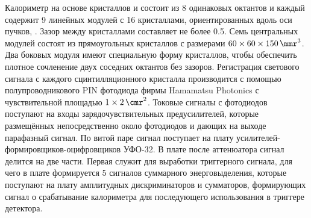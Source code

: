 Калориметр на основе кристаллов  и  состоит из 8 одинаковых октантов и каждый содержит 9 линейных модулей с \num{16} кристаллами, ориентированных вдоль оси пучков,
\cite{Aulchenko:2015msa}.
Зазор между кристаллами составляет не более \SI{0.5}{\mmr}.
Семь центральных модулей состоят из прямоугольных кристаллов с размерами $60 \times 60 \times \SI{150}{ \cubic\mmr}$.
Два боковых модуля имеют специальную форму кристаллов, чтобы обеспечить плотное сочленение двух соседних октантов без зазоров. 
Регистрация светового сигнала с каждого сцинтилляционного кристалла производится с помощью полупроводникового PIN фотодиода фирмы Hamamatsu Photonics с чувствительной площадью $1 \times \SI{2}{\square\cmr}$. 
Токовые сигналы с фотодиодов поступают на входы зарядочувствительных предусилителей,
которые размещённых непосредственно около фотодиодов и дающих на выходе парафазный сигнал.
По витой паре сигнал поступает на плату усилителей-формировщиков-оцифровщиков УФО-32.
В плате после аттенюатора сигнал делится на две части.
Первая служит для выработки триггерного сигнала,
для чего в плате формируется \num{5} сигналов суммарного энерговыделения,
которые поступают на плату амплитудных дискриминаторов и сумматоров,
формирующих сигнал о срабатывание калориметра для последующего использования в триггере детектора.



